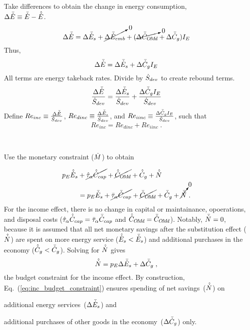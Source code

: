 \begin{landscape}
{Take differences to obtain the change in energy consumption, \\
$\Delta \bar{\dot{E}} \equiv \bar{\dot{E}} - \hat{\dot{E}}$.
%
\begin{equation}
  \Delta \bar{\dot{E}} = \Delta \bar{\dot{E}}_s 
                     + \cancelto{0}{\Delta \bar{\dot{E}}_{emb}}
                     + (\cancelto{0}{\Delta \bar{\dot{C}}_{O\!M\!d}} + \Delta \bar{\dot{C}}_g) I_E
\end{equation}
%
Thus, 
%
\begin{equation}
  \Delta \bar{\dot{E}} = \Delta \bar{\dot{E}}_s + \Delta \bar{\dot{C}}_g I_E
\end{equation}
%
All terms are energy takeback rates.
Divide by $\dot{S}_{dev}$
to create rebound terms.
%
\begin{equation}
  \frac{\Delta \bar{\dot{E}}}{\dot{S}_{dev}} = \frac{\Delta \bar{\dot{E}}_s}{\dot{S}_{dev}} + \frac{\Delta \bar{\dot{C}}_g I_E}{\dot{S}_{dev}}
\end{equation}
%
Define 
$Re_{inc} \equiv \frac{\Delta \bar{\dot{E}}}{\dot{S}_{dev}}$, 
$Re_{dinc} \equiv \frac{\Delta \bar{\dot{E}}_s}{\dot{S}_{dev}}$, and 
$Re_{iinc} \equiv \frac{\Delta \bar{\dot{C}}_g I_E}{\dot{S}_{dev}}$,
such that
%
\begin{equation} \label{eq:Re_inc_def}
  Re_{inc} = Re_{dinc} + Re_{iinc} \; .
\end{equation}
%
}
{
~

Use the monetary constraint ($\dot{M}$) to obtain

\begin{align}
  p_E \hat{\dot{E}}_s &+ \cancel{\hat{\tau}_\alpha \hat{\dot{C}}_{cap}} + \cancel{\hat{\dot{C}}_{O\!M\!d}} + \hat{\dot{C}}_g + \hat{\dot{N}} \nonumber \\
                  &= p_E \bar{\dot{E}}_s + \cancel{\bar{\tau}_\alpha \bar{\dot{C}}_{cap}} + \cancel{\bar{\dot{C}}_{O\!M\!d}} + \bar{\dot{C}}_g + \cancelto{0}{\bar{\dot{N}}} \; .
\end{align}
%
For the income effect, there is no change in capital or maintainance, opoerations, and disposal costs
($\hat{\tau}_\alpha \hat{\dot{C}}_{cap} = \bar{\tau}_\alpha \bar{\dot{C}}_{cap}$ and
$\hat{\dot{C}}_{O\!M\!d} = \bar{\dot{C}}_{O\!M\!d}$).
Notably, $\bar{\dot{N}} = 0$,
because it is assumed that all net monetary savings 
after the substitution effect ($\hat{\dot{N}}$) are spent on
more energy service ($\hat{\dot{E}}_s < \bar{\dot{E}}_s$)
and
additional purchases in the economy ($\hat{\dot{C}}_g < \bar{\dot{C}}_g$).
Solving for $\hat{\dot{N}}$ gives 
%
\begin{equation} \label{eq:inc_budget_constraint}
  \hat{\dot{N}} = p_E \Delta \bar{\dot{E}}_s + \Delta \bar{\dot{C}}_g \; ,
\end{equation}
%
the budget constraint for the income effect.
By construction, 
Eq.~(\ref{eq:inc_budget_constraint}) ensures
spending of net savings~($\hat{\dot{N}}$) on
%
\begin{enumerate*}[label={(\roman*)}]
	
  \item additional energy services~($\Delta \bar{\dot{E}}_s$) and
  
  \item additional purchases of other goods in the economy~($\Delta \bar{\dot{C}}_g$) only.
    
\end{enumerate*}
}
\end{landscape}

